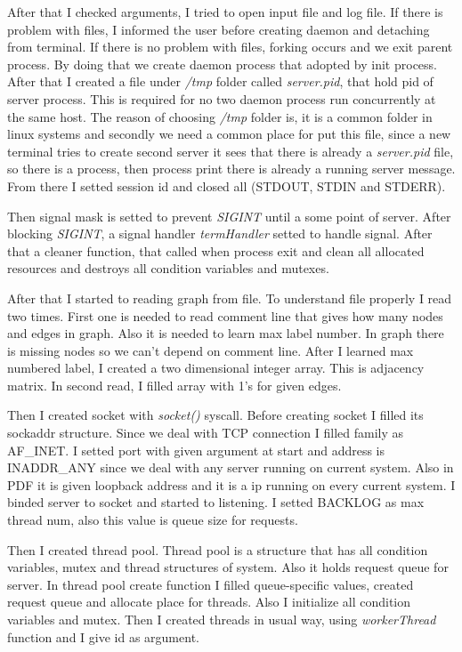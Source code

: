 \documentclass[letterpaper, 10 pt, conference]{ieeeconf}  %
\begin{document}
After that I checked arguments, I tried to open input file and log file. If there is problem with files, I informed the user before creating daemon and detaching from terminal. If there is no problem with files, forking occurs and we exit parent process. By doing that we create daemon process that adopted by init process. After that I created a file under \textit{/tmp} folder called \textit{server.pid}, that hold pid of server process. This is required for no two daemon process run concurrently at the same host. The reason of choosing \textit{/tmp} folder is, it is a common folder in linux systems and secondly we need a common place for put this file, since a new terminal tries to create second server it sees that there is already a \textit{server.pid} file, so there is a process, then process print there is already a running server message. From there I setted session id and closed all (STDOUT, STDIN and STDERR). 

Then signal mask is setted to prevent \textit{SIGINT} until a some point of server. After blocking \textit{SIGINT}, a signal handler \textit{termHandler} setted to handle signal. After that a cleaner function, that called when process exit and clean all allocated resources and destroys all condition variables and mutexes. 

After that I started to reading graph from file. To understand file properly I read two times. First one is needed to read comment line that gives how many nodes and edges in graph. Also it is needed to learn max label number. In graph there is missing nodes so we can't depend on comment line. After I learned max numbered label, I created a two dimensional integer array. This is adjacency matrix. In second read, I filled array with 1's for given edges.

Then I created socket with \textit{socket()} syscall. Before creating socket I filled its sockaddr structure. Since we deal with TCP connection I filled family as AF\_INET. I setted port with given argument at start and address is INADDR\_ANY since we deal with any server running on current system. Also in PDF it is given loopback address and it is a ip running on every current system. I binded server to socket and started to listening. I setted BACKLOG as max thread num, also this value is queue size for requests. 

Then I created thread pool. Thread pool is a structure that has all condition variables, mutex and thread structures of system. Also it holds request queue for server. In thread pool create function I filled queue-specific values, created request queue and allocate place for threads. Also I initialize all condition variables and mutex. Then I created threads in usual way, using \textit{workerThread} function and I give id as argument. 
\end{document}
